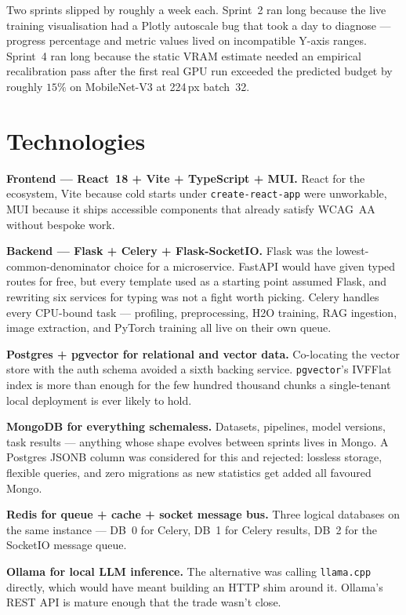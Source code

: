 \documentclass[12pt, a4paper, oneside]{report}
\begin{document}
Two sprints slipped by roughly a week each. Sprint~2 ran long because
the live training visualisation had a Plotly autoscale bug that took
a day to diagnose --- progress percentage and metric values lived on
incompatible Y-axis ranges. Sprint~4 ran long because the static VRAM
estimate needed an empirical recalibration pass after the first real
GPU run exceeded the predicted budget by roughly $15\%$ on
MobileNet-V3 at 224\,px batch~32.

\section{Technologies}

\textbf{Frontend --- React~18 + Vite + TypeScript + MUI.} React for
the ecosystem, Vite because cold starts under
\texttt{create-react-app} were unworkable, MUI because it ships
accessible components that already satisfy WCAG~AA without bespoke
work.

\textbf{Backend --- Flask + Celery + Flask-SocketIO.} Flask was the
lowest-common-denominator choice for a microservice. FastAPI would
have given typed routes for free, but every template used as a
starting point assumed Flask, and rewriting six services for typing
was not a fight worth picking. Celery handles every CPU-bound task ---
profiling, preprocessing, H2O training, RAG ingestion, image
extraction, and PyTorch training all live on their own queue.

\textbf{Postgres + pgvector for relational and vector data.}
Co-locating the vector store with the auth schema avoided a sixth
backing service. \texttt{pgvector}'s IVFFlat index is more than
enough for the few hundred thousand chunks a single-tenant local
deployment is ever likely to hold.

\textbf{MongoDB for everything schemaless.} Datasets, pipelines,
model versions, task results --- anything whose shape evolves
between sprints lives in Mongo. A Postgres JSONB column was
considered for this and rejected: lossless storage, flexible queries,
and zero migrations as new statistics get added all favoured Mongo.

\textbf{Redis for queue + cache + socket message bus.} Three logical
databases on the same instance --- DB~0 for Celery, DB~1 for Celery
results, DB~2 for the SocketIO message queue.

\textbf{Ollama for local LLM inference.} The alternative was calling
\texttt{llama.cpp} directly, which would have meant building an HTTP
shim around it. Ollama's REST API is mature enough that the trade
wasn't close.
\end{document}
